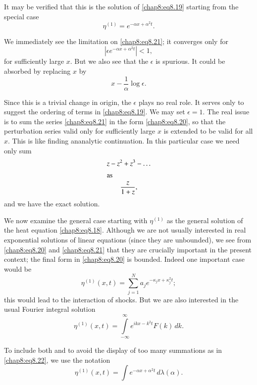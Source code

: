 It may be verified that this is the solution of \eqref{chap8:eq8.19} starting from the special case
$$
\eta^{(1)}= e^{-\alpha x+\alpha^2 t}.
$$

We immediately see the limitation on \eqref{chap8:eq8.21}; it converges only for 
$$
\left|\epsilon e^{-\alpha x+\alpha^2 t}\right|<1,
$$
\ie for sufficiently large $x$. But we also see that the $\epsilon$ is spurious. It could be absorbed by replacing $x$ by 
$$
x-\frac{1}{\alpha}\log \epsilon.
$$

Since this is a trivial change in origin, the $\epsilon$ plays no real role. It serves only to suggest the ordering of terms in \eqref{chap8:eq8.19}. We may set $\epsilon =1$. The real issue is to sum the series \eqref{chap8:eq8.21} in the form \eqref{chap8:eq8.20}, so that the perturbation series valid only for sufficiently large $x$ is extended to be valid for all $x$. This is like finding an\pageoriginale analytic continuation. In this particular case we need only sum
\begin{gather*}
z-z^2+z^3-\ldots\\
\intertext{as}
\frac{z}{1+z},
\end{gather*}
and we have the exact solution.

We now examine the general case starting with $\eta^{(1)}$ as the general solution of the heat equation \eqref{chap8:eq8.18}. Although we are not usually interested in real exponential solutions of linear equations (since they are unbounded), we see from \eqref{chap8:eq8.20} and \eqref{chap8:eq8.21} that they are crucially important in the present context; the final form in \eqref{chap8:eq8.20} is bounded. Indeed one important case would be 
\begin{equation}
\eta^{(1)}(x,t)=\sum\limits_{j=1}^N a_j e^{-\kappa_j x+\kappa_j^2 t}; \tag{8.22}\label{chap8:eq8.22}
\end{equation}
this would lead to the interaction of shocks. But we are also interested in the usual Fourier integral solution
\begin{equation}
\eta^{(1)}(x,t)=\int\limits_{-\infty}^\infty e^{ikx-k^2 t}F(k)\,dk. \tag{8.23}\label{chap8:eq8.23}
\end{equation}

To include both and to avoid the display of too many summations as in \eqref{chap8:eq8.22}, we use the notation
\begin{equation}
\eta^{(1)}(x,t)=\int e^{-\alpha x+\alpha^2 t}\,d\lambda(\alpha). \tag{8.24}\label{chap8:eq8.24}
\end{equation}

